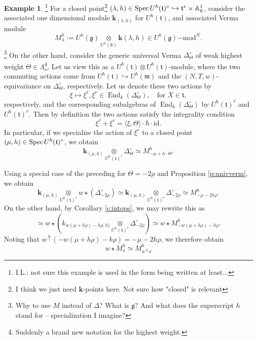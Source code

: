 \documentclass{amsart}
\theoremstyle{definition}
\newtheorem{Ex}[Thm]{Example}
\newcommand{\fm}{\mathfrak{m}}
\newcommand{\fb}{\mathfrak{b}}
\newcommand{\lmod}{\on{-mod}}
\newcommand{\fg}{\mathfrak{g}}
\newcommand{\Spec}{\on{Spec}\hspace{.5mm}}
\newcommand{\ft}{\mathfrak{t}}
\newcommand{\on}{\mathrm}
\newcommand{\g}{\mathfrak{g}}
\newcommand{\bk}{\mathbf{k}}
\newcommand{\End}{\operatorname{End}}
\numberwithin{equation}{section}
\begin{document}
\begin{Ex}\footnote{I.L.: not sure this example is used in the form being written at least...} For a closed point\footnote{I think we just need $\bk$-points here. Not sure how "closed" is relevant} $(\lambda, h) \in \Spec U^\hbar(\ft)^\circ \hookrightarrow \ft^* \times \mathbb{A}^1_\hbar$, consider the associated one dimensional module $\bk_{(\lambda, h)}$ for $U^\hbar(\ft)$, and associated Verma module 
$$M^h_{\lambda} := U^h(\fg) \underset{U^h(\fb)} \otimes \bk(\lambda, h) \in U^h(\fg)\lmod^N.$$\footnote{Why to use $M$ instead of $\Delta$? What is $\g$? And what does the superscript $h$ stand for -- specialization I imagine?}
On the other hand, consider the generic universal Verma $\Delta^\circ_\Theta$ of weak highest weight $\Theta \in \Lambda$\footnote{Suddenly a brand new notation for the highest weight.}. Let us view this as a $U^\hbar(\ft) \otimes U^\hbar(\ft)$-module, where the two commuting actions come from $U^\hbar(\ft) \hookrightarrow U^\hbar(\fm)$ and the $(N,T,w)$-equivariance on $\Delta^\circ_\Theta$, respectively. Let us denote these two actions by $$\xi \mapsto \xi^\ell, \xi^r \in \End_k(\Delta^\circ_\Theta), \quad  \text{for } X \in \ft,$$ respectively, and the corresponding subalgebras of $\End_k(\Delta^\circ_\Theta)$ by $U^\hbar(\ft)^\ell$ and $U^\hbar(\ft)^r$. Then by definition the two actions satisfy the integrality condition 
$$\xi^\ell + \xi^r = \langle \xi, \Theta \rangle \cdot \hbar  \cdot \on{id}.$$ 
In particular, if we specialize the action of $\xi^r$ to a closed point $(\mu, h) \in \Spec U^\hbar(\ft)^\circ$, we obtain
$$\bk_{(\mu, h)} \underset{U^\hbar(\ft)^r} \otimes \Delta^\circ_{\Theta} \simeq M^h_{-\mu + h \cdot \Theta}.$$

Using a special case of the preceding for $\Theta = - 2\rho$ and Proposition \ref{p:univverm}, we obtain 
\begin{equation} \label{var1}\bk_{(\mu, h)} \underset{U^\hbar(\ft)^r} \otimes w \star (\Delta^\circ_{-2\rho}) \simeq  \bk_{(\mu, h)} \underset{U^\hbar(\ft)^r} \otimes \Delta^\circ_{-2\rho} \simeq M^h_{-\mu - 2 h \rho}.\end{equation}
On the other hand, by Corollary \ref{c:intops}, we may rewrite this as
$$\simeq w \star ( k_{w(\mu + h \rho)  - h\rho, h)} \underset{U^\hbar(\ft)^r} \otimes \Delta^\circ_{-2\rho}) \simeq w \star M^h_{- w(\mu + h \rho) - h\rho}.$$
Noting that $w \overset{h} \cdot (-w(\mu + h\rho) - h\rho) = -\mu - 2h\rho$, we therefore obtain
\begin{equation}\label{eq:Weyl_action_Verma}
w \star M^h_{x} \simeq M^h_{w \overset{h} \cdot x}\end{equation}
\end{Ex}
\fi 
\end{document}
